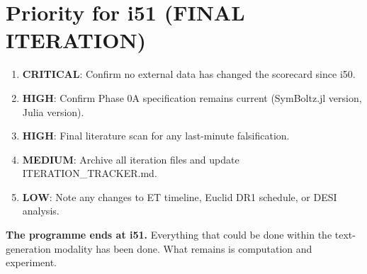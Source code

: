 \documentclass[11pt,a4paper]{article}
\begin{document}
\part{Priority for i51 (FINAL ITERATION)}
\label{part:i51}

\begin{enumerate}
\item \textbf{CRITICAL}: Confirm no external data has changed the scorecard since i50.
\item \textbf{HIGH}: Confirm Phase 0A specification remains current (SymBoltz.jl version, Julia version).
\item \textbf{HIGH}: Final literature scan for any last-minute falsification.
\item \textbf{MEDIUM}: Archive all iteration files and update ITERATION\_TRACKER.md.
\item \textbf{LOW}: Note any changes to ET timeline, Euclid DR1 schedule, or DESI analysis.
\end{enumerate}

\textbf{The programme ends at i51.} Everything that could be done within the text-generation modality has been done. What remains is computation and experiment.
\end{document}
